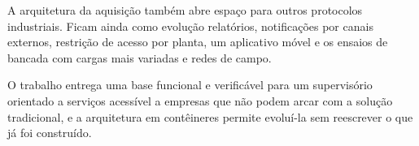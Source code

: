 \par A arquitetura da aquisição também abre espaço para outros protocolos industriais. Ficam ainda como evolução relatórios, notificações por canais externos, restrição de acesso por planta, um aplicativo móvel e os ensaios de bancada com cargas mais variadas e redes de campo.

\par O trabalho entrega uma base funcional e verificável para um supervisório orientado a serviços acessível a empresas que não podem arcar com a solução tradicional, e a arquitetura em contêineres permite evoluí-la sem reescrever o que já foi construído.

